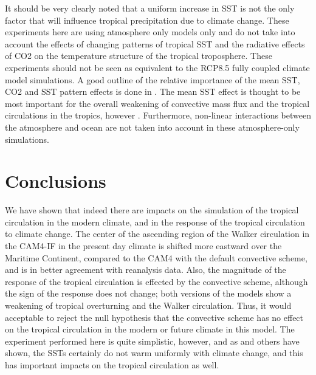 \documentclass[letterpaper,12pt,titlepage,oneside,final]{book}
\begin{document}
It should be very clearly noted that a uniform increase in SST is not the only factor that will influence tropical precipitation due to climate change. These experiments here are using atmosphere only models only and do not take into account the effects of changing patterns of tropical SST and the radiative effects of CO2 on the temperature structure of the tropical troposphere. These experiments should not be seen as equivalent to the RCP8.5 fully coupled climate model simulations. A good outline of the relative importance of the mean SST, CO2 and SST pattern effects is done in \citep{he_anthropogenic_2015}. The mean SST effect is thought to be most important for the overall weakening of convective mass flux and the tropical circulations in the tropics, however \citep{held_robust_2006,ma_mechanisms_2011,vecchi_global_2007,he_anthropogenic_2015}. Furthermore, non-linear interactions between the atmosphere and ocean are not taken into account in these atmosphere-only simulations.

\section{Conclusions}

We have shown that indeed there are impacts on the simulation of the tropical circulation in the modern climate, and in the response of the tropical circulation to climate change. The center of the ascending region of the Walker circulation in the CAM4-IF in the present day climate is shifted more eastward over the Maritime Continent, compared to the CAM4 with the default convective scheme, and is in better agreement with reanalysis data. Also, the magnitude of the response of the tropical circulation is effected by the convective scheme, although the sign of the response does not change; both versions of the models show a weakening of tropical overturning and the Walker circulation. Thus, it would acceptable to reject the null hypothesis that the convective scheme has no effect on the tropical circulation in the modern or future climate in this model. The experiment performed here is quite simplistic, however, and as \citep{he_anthropogenic_2015,ma_regional_2012} and others have shown, the SSTs certainly do not warm uniformly with climate change, and this has important impacts on the tropical circulation as well.
\end{document}
